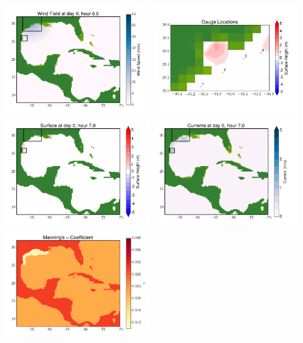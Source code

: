 \documentclass[11pt]{article}
\begin{document}
\vskip 10pt 
\includegraphics[width=0.475\textwidth]{frame0078fig9.png}
\includegraphics[width=0.475\textwidth]{frame0078fig10.png}
\vskip 10pt 
\includegraphics[width=0.475\textwidth]{frame0079fig1.png}
\includegraphics[width=0.475\textwidth]{frame0079fig2.png}
\vskip 10pt 
\includegraphics[width=0.475\textwidth]{frame0079fig3.png}
\end{document}
